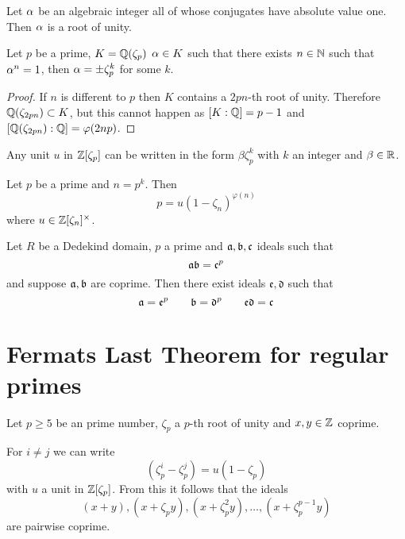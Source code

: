 \begin{lemma}\label{lemma:alg_int_abs_val_one}
	Let $\alpha$ be an algebraic integer all of whose conjugates have absolute value one. Then $\alpha$ is a root of unity.
\end{lemma}

\begin{lemma}\label{lem:roots_of_unity_in_cyclo}
	Let $p$ be a prime, $K=\mathbb{Q}(\zeta_p)$ $\alpha \in K$ such that there exists $n \in \mathbb{N}$ such that $\alpha^n=1$, then $\alpha =\pm \zeta_p^k$ for some $k$.
\end{lemma}

\begin{proof}
	If $n$ is different to $p$ then $K$ contains a $2pn$-th root of unity. Therefore $\mathbb{Q}(\zeta_{2pn}) \subset K$, but this cannot happen as $[K : \mathbb{Q}]=p-1$ and $[\mathbb{Q}(\zeta_{2pn}): \mathbb{Q} ] = \varphi(2np)$.

\end{proof}

\begin{lemma}\label{lemma:unit_lemma}
	Any unit $u$ in $\mathbb{Z}[\zeta_p]$ can be written in the form $\beta \zeta_p^k  $ with $k$ an integer and $\beta \in \mathbb{R}$.
\end{lemma}

\begin{lemma}\label{lemma:fac_of_p_in_p_th_root}
	Let $p$ be a prime and $n=p^k$. Then \[p=u(1-\zeta_n)^{\varphi(n)}\] where $u \in \mathbb{Z}[\zeta_n]^{\times}$.
\end{lemma}

\begin{lemma}\label{lemma:ideals_mult_to_power}
	Let $R$ be a Dedekind domain, $p$ a prime and $\mathfrak{a},\mathfrak{b},\mathfrak{c}$ ideals such that \[\mathfrak{a}\mathfrak{b}=\mathfrak{c}^p\] and suppose $\mathfrak{a},\mathfrak{b}$ are coprime. Then there exist ideals $\mathfrak{e},\mathfrak{d}$ such that \[\mathfrak{a}=\mathfrak{e}^p \qquad \mathfrak{b}=\mathfrak{d}^p \qquad \mathfrak{e}\mathfrak{d}=\mathfrak{c}\]
\end{lemma}




\section{Fermats Last Theorem for regular primes}

\begin{lemma}\label{lem:flt_fact_2}
	Let $p \geq 5$ be an prime number, $\zeta_p$ a $p$-th root of unity and $x, y \in \mathbb{Z}$ coprime.

	 For $i \neq j$ we can write \[(\zeta_p^i-\zeta_p^j)=u(1-\zeta_p)\] with $u$ a unit in $\mathbb{Z}[\zeta_p]$. From this it follows that the ideals \[(x+y),(x+\zeta_py),(x+\zeta_p^2y),\dots,(x+\zeta_p^{p-1}y)\] are pairwise coprime.
\end{lemma}

